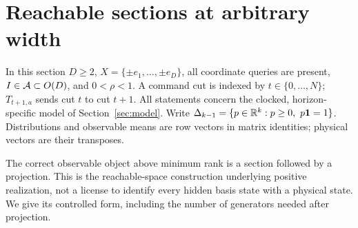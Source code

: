 \section{Reachable sections at arbitrary width}\label{sec:lifts51}
In this section $D\ge2$, $X=\{\pm e_1,\ldots,\pm e_D\}$, all
coordinate queries are present, $I\in\mathcal A\subset O(D)$, and
$0<\rho<1$. A command cut is indexed by $t\in\{0,\ldots,N\}$;
$T_{t+1,a}$ sends cut $t$ to cut $t+1$. All statements concern the
clocked, horizon-specific model of Section~\ref{sec:model}.
Write $\Delta_{k-1}=\{p\in\R^k:p\ge0,\ p\mathbf1=1\}$.
Distributions and observable means are row vectors in matrix identities;
physical vectors are their transposes.

The correct observable object above minimum rank is a section followed
by a projection. This is the reachable-space construction underlying
positive realization, not a license to identify every hidden basis
state with a physical state. We give its controlled form, including the
number of generators needed after projection.

